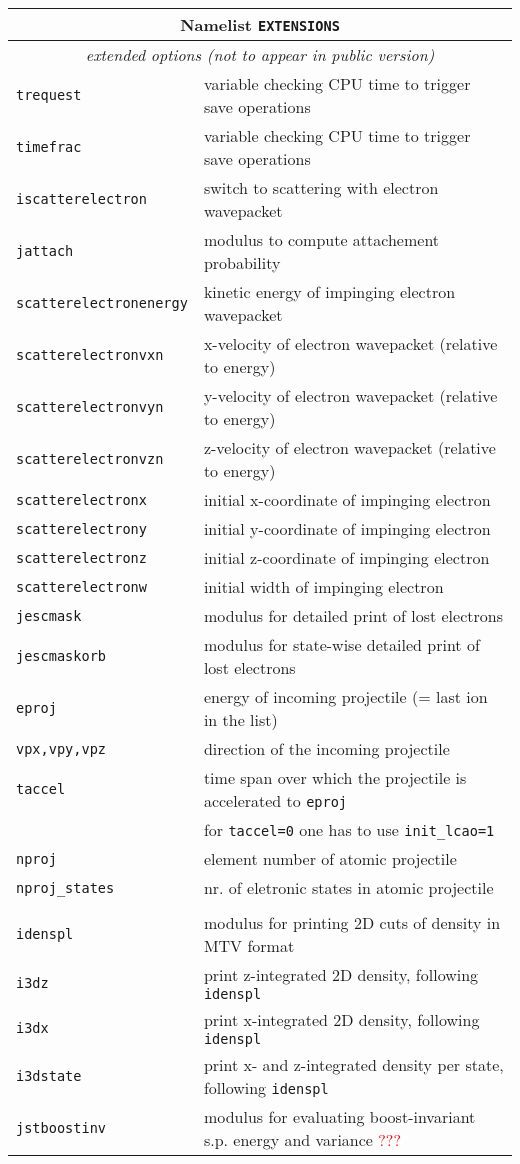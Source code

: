 \documentclass[12pt]{article}
\begin{document}
\begin{tabular}{ll}
\hline
\multicolumn{2}{c}{Namelist {\tt EXTENSIONS}} in {\tt for005.<name>} \\
\hline
\multicolumn{2}{c}{\it extended options (not to appear in public version)} \\
\hline
{\tt trequest} &  variable checking CPU time to trigger save
operations \\
{\tt timefrac} &  variable checking CPU time to trigger save operations  \\
{\tt iscatterelectron} &  switch to scattering with electron wavepacket\\
{\tt jattach} &  modulus to compute attachement probability\\
{\tt scatterelectronenergy} &  kinetic energy of impinging electron wavepacket\\
{\tt scatterelectronvxn} &  x-velocity  of electron
wavepacket (relative to energy)\\
{\tt scatterelectronvyn} &  y-velocity  of electron
wavepacket (relative to energy) \\
{\tt scatterelectronvzn} &  z-velocity  of electron
wavepacket (relative to energy) \\
{\tt scatterelectronx} & initial x-coordinate of impinging electron \\
{\tt scatterelectrony} & initial y-coordinate of impinging electron  \\
{\tt scatterelectronz} & initial z-coordinate of impinging electron  \\
{\tt scatterelectronw} & initial width  of impinging electron \\
{\tt jescmask} & modulus for detailed print of lost electrons \\
{\tt jescmaskorb} & modulus for state-wise detailed print of lost electrons \\
{\tt eproj}& energy of incoming projectile (= last ion in the list)
\\
{\tt vpx,vpy,vpz}& direction of the incoming projectile
\\
{\tt taccel}& time span over which the projectile is accelerated to
             {\tt eproj}\\
& for {\tt taccel=0} one has to use {\tt init\_lcao=1}\\
{\tt nproj} & element number of atomic projectile \\
{\tt nproj\_states} & nr. of eletronic states in atomic projectile \\
\\
{\tt idenspl} & modulus for printing 2D cuts of density in MTV format\\
{\tt i3dz} &  print z-integrated 2D density, following {\tt idenspl}\\
{\tt i3dx} &  print x-integrated 2D density, following {\tt idenspl}\\
{\tt i3dstate} & print  x- and z-integrated density per state, following {\tt idenspl}\\
{\tt jstboostinv} & modulus for evaluating boost-invariant s.p. energy
and variance \textcolor{red}{???}\\
\hline
\end{tabular}
\end{document}
